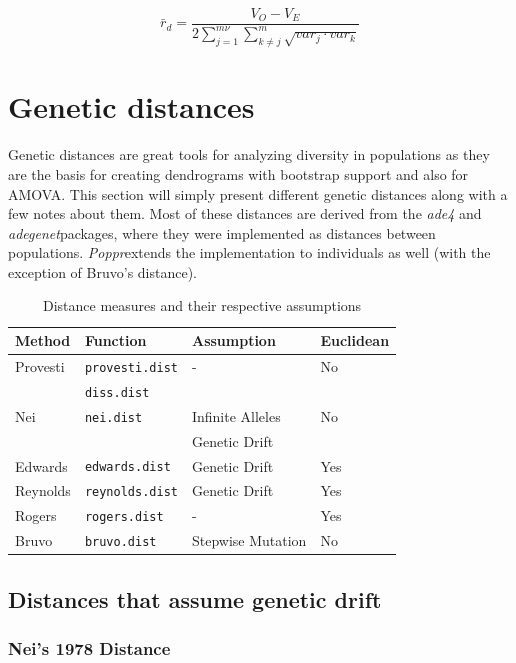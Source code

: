 \documentclass[letterpaper]{article}\usepackage[]{graphicx}\usepackage[]{color}
\newcommand{\Poppr}{\textit{Poppr}}
\newcommand{\adegenet}{\textit{adegenet}}
\begin{document}
\begin{equation}
\label{eq:r_d}
\bar{r}_d = \frac{V_O - V_E}
{2\displaystyle \sum_{j=1}^{m\nu}\displaystyle \sum_{k \neq j}^{m}\sqrt{var_j\cdot{}var_k}}
\end{equation}

\section{Genetic distances}

Genetic distances are great tools for analyzing diversity in
populations as they are the basis for creating dendrograms with bootstrap
support and also for AMOVA. This section will simply present different genetic
distances along with a few notes about them. Most of these distances are derived
from the \textit{ade4} and \adegenet packages, where they were implemented as
distances between populations. \Poppr extends the implementation to individuals
as well (with the exception of Bruvo's distance).

\begin{table}[ht]
\centering
\caption{Distance measures and their respective assumptions}
\begin{tabular}{llll}
  \hline
 Method & Function & Assumption & Euclidean \\ 
  \hline
Provesti & \texttt{provesti.dist} & - & No \\
 & \texttt{diss.dist} & & \\
Nei & \texttt{nei.dist} & Infinite Alleles & No \\
 & & Genetic Drift & \\
Edwards & \texttt{edwards.dist} & Genetic Drift & Yes \\
Reynolds & \texttt{reynolds.dist} & Genetic Drift & Yes \\
Rogers & \texttt{rogers.dist} & - & Yes \\
Bruvo & \texttt{bruvo.dist} & Stepwise Mutation & No \\
   \hline
\end{tabular}
\end{table}

\subsection{Distances that assume genetic drift}
\subsubsection{Nei's 1978 Distance}
\end{document}
